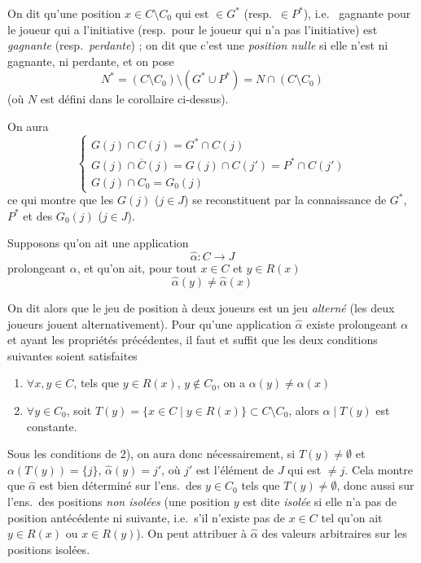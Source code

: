 \documentclass[11pt,a4paper]{article}
\begin{document}
On dit qu'une position $x \in C \setminus C_0$ qui est $\in G^{*}$ (resp.\
$\in P^{*}$), i.e.\  gagnante pour le joueur qui a
l'initiative (resp.\ pour le joueur qui n'a pas l'initiative) est
\emph{gagnante} (resp.\ \emph{perdante}) ; on dit que c'est une
\emph{position nulle}  si elle n'est ni gagnante, ni
perdante, et on pose
\[
N^{*} = (C \setminus C_0) \setminus (G^{*} \cup P^{*}) = N \cap (C \setminus C_0)
\]
(où $N$ est défini dans le corollaire ci-dessus).

On aura
\[
\begin{cases}
G(j) \cap C(j) = G^{*} \cap C(j) \\
G(j) \cap \overline{C}(j) = G(j) \cap C(j') = P^{*} \cap C(j') \\
G(j) \cap C_0 = G_0(j)
\end{cases}
\]
ce qui montre que les $G(j)$ ($j \in J$) se reconstituent par la connaissance
de $G^{*}$, $P^{*}$ et des $G_0(j)$ ($j \in J$).

Supposons qu'on ait une application
\[
\hat\alpha : C \to J
\]
prolongeant $\alpha$, et qu'on ait, pour tout $x \in C$ et $y \in R(x)$
\[
\hat\alpha(y) \neq \hat\alpha(x)
\]

On dit alors que le jeu  de position à deux joueurs est un jeu
\emph{alterné} (les deux joueurs jouent alternativement). Pour qu'une
application $\hat\alpha$ existe prolongeant $\alpha$ et ayant les propriétés
précédentes, il faut et suffit que les deux conditions suivantes soient
satisfaites
\begin{enumerate}
  \item $\forall x, y \in C$, tels que $y \in R(x)$, $y \notin C_0$, on a
  $\alpha(y) \neq \alpha(x)$
  \item $\forall y \in C_0$, soit
  $T(y) = \{ x \in C \mid y \in R(x) \} \subset C \setminus C_0$, alors
  $\alpha \mid T(y)$ est constante.
\end{enumerate}

Sous les conditions de 2), on aura donc nécessairement, si
$T(y) \neq \emptyset$ et $\alpha(T(y)) = \{ j \}$, $\hat\alpha(y) = j'$, où
$j'$ est l'élément de $J$ qui est $\neq j$. Cela montre que $\hat\alpha$ est
bien déterminé sur l'ens.\ des $y \in C_0$ tels que $T(y) \neq \emptyset$,
donc aussi sur l'ens.\ des positions \emph{non isolées} (une position $y$ est
dite \emph{isolée} si elle n'a pas de position antécédente ni suivante, i.e.\
s'il n'existe pas de $x \in C$ tel qu'on ait $y \in R(x)$ ou $x \in R(y)$). On
peut attribuer à $\hat\alpha$ des valeurs arbitraires sur les positions
isolées.
\end{document}

